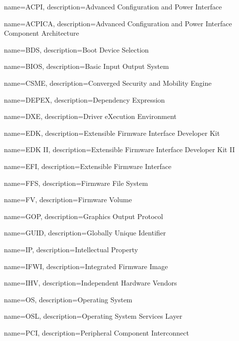  {
  name=ACPI,
  description={Advanced Configuration and Power Interface
  }
}

 {
  name=ACPICA,
  description={Advanced Configuration and Power Interface Component Architecture
  }
}

 {
  name=BDS,
  description={Boot Device Selection
  }
}

 {
  name=BIOS,
  description={Basic Input Output System
  }
}


 {
  name=CSME,
  description={Converged Security and Mobility Engine
  }
}

 {
  name=DEPEX,
  description={Dependency Expression
  }
}


 {
  name=DXE,
  description={Driver eXecution Environment 
  }
}

 {
  name=EDK,
  description={Extensible Firmware Interface Developer Kit
  }
}

 {
  name={EDK II},
  description={Extensible Firmware Interface Developer Kit II
  }
}

 {
  name=EFI,
  description={Extensible Firmware Interface
  }
}

 {
    name=FFS,
    description={Firmware File System
    }
}

 {
    name=FV,
    description={Firmware Volume
    }
}

 {
    name=GOP,
    description={Graphics Output Protocol
    }
}

 {
    name=GUID,
    description={Globally Unique Identifier
    }
}

 {
    name=IP,
    description={Intellectual Property
    }
}

 {
    name=IFWI,
    description={Integrated Firmware Image
    }
}

 {
    name=IHV,
    description={Independent Hardware Vendors
    }
}

 {
  name=OS,
  description={Operating System
  }
}

 {
  name=OSL,
  description={Operating System Services Layer
  }
}

 {
  name=PCI,
  description={Peripheral Component Interconnect
  }
}

